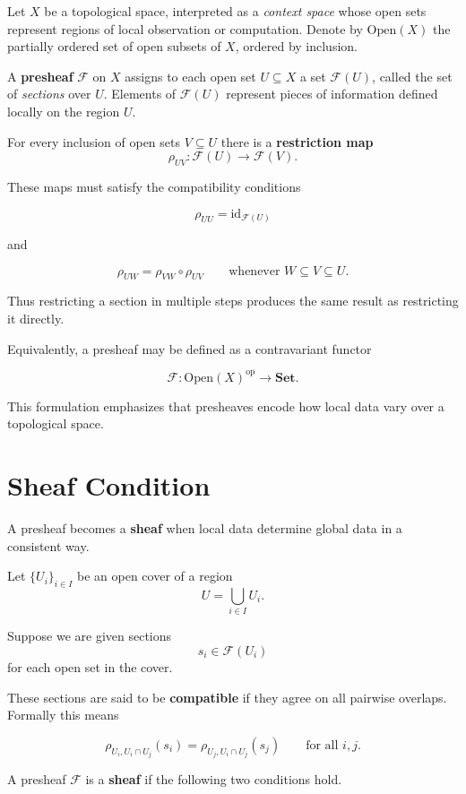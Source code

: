 \documentclass[11pt, openany]{book}
\theoremstyle{plain}
\theoremstyle{definition}
\theoremstyle{remark}
\begin{document}
Let $X$ be a topological space, interpreted as a \emph{context space}
whose open sets represent regions of local observation or computation.
Denote by $\mathrm{Open}(X)$ the partially ordered set of open subsets
of $X$, ordered by inclusion.

A \textbf{presheaf} $\mathcal{F}$ on $X$ assigns to each open set
$U\subseteq X$ a set $\mathcal{F}(U)$, called the set of \emph{sections}
over $U$.  Elements of $\mathcal{F}(U)$ represent pieces of information
defined locally on the region $U$.

For every inclusion of open sets $V\subseteq U$ there is a
\textbf{restriction map}
\[
\rho_{UV}:\mathcal{F}(U)\to\mathcal{F}(V).
\]

These maps must satisfy the compatibility conditions

\[
\rho_{UU}=\mathrm{id}_{\mathcal{F}(U)}
\]

and

\[
\rho_{UW}=\rho_{VW}\circ\rho_{UV}
\qquad
\text{whenever } W\subseteq V\subseteq U.
\]

Thus restricting a section in multiple steps produces the same result as
restricting it directly.

Equivalently, a presheaf may be defined as a contravariant functor

\[
\mathcal{F}:\mathrm{Open}(X)^{\mathrm{op}}\to\mathbf{Set}.
\]

This formulation emphasizes that presheaves encode how local data vary
over a topological space.

\section{Sheaf Condition}

A presheaf becomes a \textbf{sheaf} when local data determine global
data in a consistent way.

Let $\{U_i\}_{i\in I}$ be an open cover of a region
\[
U=\bigcup_{i\in I}U_i.
\]

Suppose we are given sections
\[
s_i\in\mathcal{F}(U_i)
\]
for each open set in the cover.

These sections are said to be \textbf{compatible} if they agree on all
pairwise overlaps.  Formally this means

\[
\rho_{U_i,U_i\cap U_j}(s_i)
=
\rho_{U_j,U_i\cap U_j}(s_j)
\qquad
\text{for all }i,j.
\]

A presheaf $\mathcal{F}$ is a \textbf{sheaf} if the following two
conditions hold.
\end{document}
